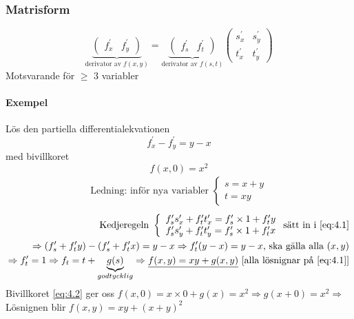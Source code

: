 \documentclass{article}
\begin{document}
\begin{enumerate}
	\subsubsection*{Matrisform}
	\[
	\underbrace{\begin{pmatrix} f_{x}^{\prime} & f_{y}^{\prime} \end{pmatrix}}_{\text{derivator av }f(x,y)} =
	\underbrace{\begin{pmatrix} f_{s}^{\prime} & f_{t}^{\prime} \end{pmatrix}}_{\text{derivator av }f(s,t)}
	\begin{pmatrix} s_{x}^{\prime} & s_{y}^{\prime} \\ t_{x}^{\prime} & t_{y}^{\prime} \end{pmatrix}
	\]
	Motsvarande för \(\geq\) 3 variabler
\end{enumerate}

\newpage
\paragraph{Exempel} Lös den partiella differentialekvationen
\begin{equation} \label{eq:4.1}
	f_{x}^{\prime} - f_{y}^{\prime} = y-x
\end{equation}
med bivillkoret \begin{equation}\label{eq:4.2}f(x,0) = x^2\end{equation}
\[
\begin{split}
	\text{Ledning: inför nya variabler } \left\{\begin{array}{rcl}
	s = x+y \\ t = xy
	\end{array}\right.
\end{split}
\]
\[
\begin{split}
	\text{Kedjeregeln } \left\{\begin{array}{rcl}
		f_{s}^{\prime}s_{x}^{\prime} + f_{t}^{\prime}t_{x}^{\prime} = 
		f_{s}^{\prime}\times1 + f_{t}^{\prime}y \\
		f_{s}^{\prime}s_{y}^{\prime} + f_{t}^{\prime}t_{y}^{\prime} =
		f_{s}^{\prime}\times1 + f_{t}^{\prime}x
	\end{array}\right.
	\text{sätt in i \eqref{eq:4.1}} \\
	\Rightarrow (f_{s}^{\prime}+f_{t}^{\prime}y) - (f_{s}^{\prime}+f_{t}^{\prime}x) = y-x
	\Rightarrow f_{t}^{\prime}(y-x) = y-x \text{, ska gälla alla } (x,y) \\
	\Rightarrow f_{t}^{\prime} = 1 \Rightarrow f_{t} = t + \underbrace{g(s)}_{godtycklig}
	\Rightarrow \underline{f(x,y) = xy + g(x,y)} \text{ [alla lösnignar på \eqref{eq:4.1}]}
\end{split}
\]
Bivillkoret \eqref{eq:4.2} ger oss \(f(x,0) = x \times 0 + g(x) = x^2 \Rightarrow g(x+0) = x^2 \Rightarrow\)
Lösnignen blir \(f(x,y) = xy + (x+y)^2\)
\end{document}
